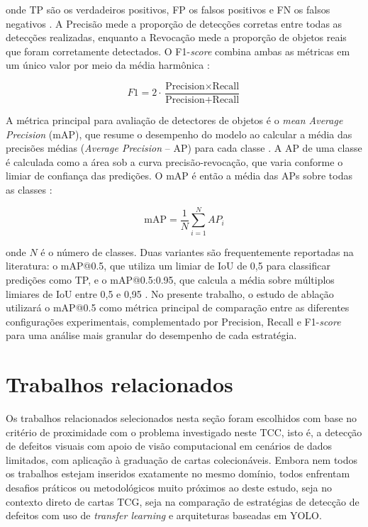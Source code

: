 \documentclass[
    12pt,                %
    openright,           %
    oneside,             %
    a4paper,             %
    english,             %
    brazil               %
]{abntex2}
\begin{document}
onde TP são os verdadeiros positivos, FP os falsos positivos
e FN os falsos negativos \cite{Ramos2025}. A Precisão mede
a proporção de detecções corretas entre todas as detecções
realizadas, enquanto a Revocação mede a proporção de objetos
reais que foram corretamente detectados. O F1-\textit{score}
combina ambas as métricas em um único valor por meio da
média harmônica \cite{Ramos2025}:

\begin{equation}
    F1 = 2 \cdot \frac{\text{Precision} \times \text{Recall}}
    {\text{Precision} + \text{Recall}}
\end{equation}

A métrica principal para avaliação de detectores de objetos
é o \textit{mean Average Precision} (mAP), que resume o
desempenho do modelo ao calcular a média das precisões médias
(\textit{Average Precision} -- AP) para cada classe
\cite{Ramos2025}. A AP de uma classe é calculada como a área
sob a curva precisão-revocação, que varia conforme o limiar
de confiança das predições. O mAP é então a média das APs
sobre todas as classes \cite{Ramos2025}:

\begin{equation}
    \text{mAP} = \frac{1}{N} \sum_{i=1}^{N} AP_i
\end{equation}

onde $N$ é o número de classes. Duas variantes são
frequentemente reportadas na literatura: o mAP@0.5, que
utiliza um limiar de IoU de 0,5 para classificar predições
como TP, e o mAP@0.5:0.95, que calcula a média sobre
múltiplos limiares de IoU entre 0,5 e 0,95 \cite{Ramos2025}.
No presente trabalho, o estudo de ablação utilizará o
mAP@0.5 como métrica principal de comparação entre as
diferentes configurações experimentais, complementado por
Precision, Recall e F1-\textit{score} para uma análise
mais granular do desempenho de cada estratégia.


\section{Trabalhos relacionados}
\label{sec:trabalhos_relacionados}

Os trabalhos relacionados selecionados nesta seção foram escolhidos com base no critério de proximidade com o problema investigado neste TCC, isto é, a detecção de defeitos visuais com apoio de visão computacional em cenários de dados limitados, com aplicação à graduação de cartas colecionáveis. Embora nem todos os trabalhos estejam inseridos exatamente no mesmo domínio, todos enfrentam desafios práticos ou metodológicos muito próximos ao deste estudo, seja no contexto direto de cartas TCG, seja na comparação de estratégias de detecção de defeitos com uso de \textit{transfer learning} e arquiteturas baseadas em YOLO. 
\end{document}
